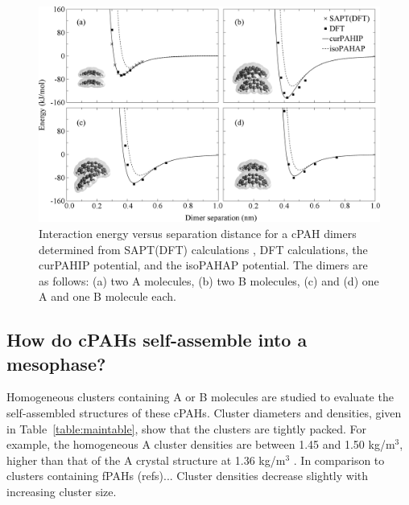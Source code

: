 \begin{figure}[!tbh]
\centering
\includegraphics[width=1\linewidth]{Figures/potentialDFT_curves.eps}
\caption{Interaction energy versus separation distance for a cPAH dimers determined from SAPT(DFT) calculations \cite{Cabaleiro-Lago2018}, DFT calculations, the curPAHIP potential, and the isoPAHAP potential. The dimers are as follows: (a) two A molecules, (b) two B molecules, (c) and (d) one A and one B molecule each.}
\label{fig:potentialDFTcurves}
\end{figure}
%

\subsection{How do cPAHs self-assemble into a mesophase?}



Homogeneous clusters containing A or B molecules are studied to evaluate the self-assembled structures of these cPAHs. Cluster diameters and densities, given in Table~\ref{table:maintable}, show that the clusters are tightly packed. For example, the homogeneous A cluster densities are between 1.45 and 1.50 kg/$\text{m}^{3}$, higher than that of the A crystal structure at 1.36 kg/$\text{m}^{3}$ \cite{CORANN11unitcell}. In comparison to clusters containing fPAHs (refs)... %
Cluster densities decrease slightly with increasing cluster size. %

